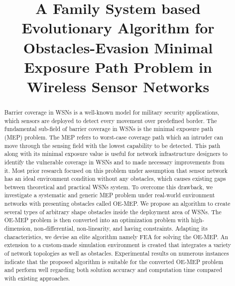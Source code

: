 \documentclass[final]{elsarticle}
\begin{document}
\begin{frontmatter}
\title{A Family System based Evolutionary Algorithm for Obstacles-Evasion Minimal Exposure Path Problem in Wireless Sensor Networks}


%
%
\begin{abstract}
Barrier coverage in WSNs is a well-known model for military security applications, which sensors are deployed to detect every movement over predefined border. The fundamental sub-field of barrier coverage in WSNs is the minimal exposure path (MEP) problem. The MEP refers to worst-case coverage path which an intruder can move through the sensing field with the lowest capability to be detected. This path along with its minimal exposure value is useful for network infrastructure designers to identify the vulnerable coverage in WSNs and to made necessary improvements from it. Most prior research focused on this problem under assumption that sensor network has an ideal environment condition without any obstacles, which causes existing gaps between theoretical and practical WSNs system. To overcome this drawback, we investigate a systematic and generic MEP problem under real-world environment networks with presenting obstacles called OE-MEP. We propose an algorithm to create several types of arbitrary shape obstacles inside the deployment area of WSNs. The OE-MEP problem is then converted into an optimization problem with high-dimension, non-differential, non-linearity, and having constraints. Adapting its characteristics, we devise an elite algorithm namely FEA for solving the OE-MEP. An extension to a custom-made simulation environment is created that integrates a variety of network topologies as well as obstacles. Experimental results on numerous instances indicate that the proposed algorithm is suitable for the converted OE-MEP problem and perform well regarding both solution accuracy and computation time compared with existing approaches.
  

\end{abstract}
\end{frontmatter}
\end{document}
